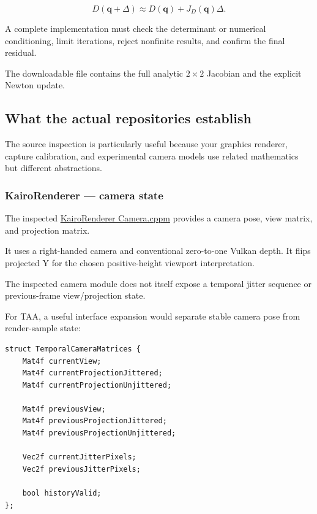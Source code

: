 \[
 D(\mathbf q+\Delta) \approx D(\mathbf q)+J_D(\mathbf q)\Delta.
\]

A complete implementation must check the determinant or numerical conditioning, limit iterations, reject nonfinite results, and confirm the final residual.

The downloadable file contains the full analytic \(2\times2\) Jacobian and the explicit Newton update.

\subsection{What the actual repositories establish}\label{02-foundations-ii-ch037-what-the-actual-repositories-establish}

\hypertarget{02-foundations-ii-ch037-what-the-actual-repositories-establish}{}

The source inspection is particularly useful because your graphics renderer, capture calibration, and experimental camera models use related mathematics but different abstractions.

\subsubsection{KairoRenderer --- camera state}\label{02-foundations-ii-ch037-kairorenderer-camera-state}

\hypertarget{02-foundations-ii-ch037-kairorenderer-camera-state}{}

The inspected \href{https://github.com/swayam8624/KairoRenderer/blob/main/Camera.cppm?utm_source=chatgpt.com}{KairoRenderer Camera.cppm} provides a camera pose, view matrix, and projection matrix.

It uses a right-handed camera and conventional zero-to-one Vulkan depth. It flips projected Y for the chosen positive-height viewport interpretation.

The inspected camera module does not itself expose a temporal jitter sequence or previous-frame view/projection state.

For TAA, a useful interface expansion would separate stable camera pose from render-sample state:

\begin{verbatim}
struct TemporalCameraMatrices {
    Mat4f currentView;
    Mat4f currentProjectionJittered;
    Mat4f currentProjectionUnjittered;

    Mat4f previousView;
    Mat4f previousProjectionJittered;
    Mat4f previousProjectionUnjittered;

    Vec2f currentJitterPixels;
    Vec2f previousJitterPixels;

    bool historyValid;
};
\end{verbatim}


